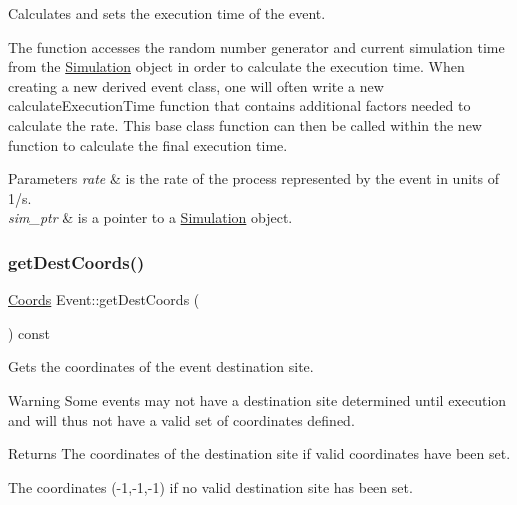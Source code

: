 Calculates and sets the execution time of the event. 

The function accesses the random number generator and current simulation time from the \hyperlink{class_simulation}{Simulation} object in order to calculate the execution time. When creating a new derived event class, one will often write a new calculate\+Execution\+Time function that contains additional factors needed to calculate the rate. This base class function can then be called within the new function to calculate the final execution time. 
\begin{DoxyParams}{Parameters}
{\em rate} & is the rate of the process represented by the event in units of 1/s. \\
\hline
{\em sim\+\_\+ptr} & is a pointer to a \hyperlink{class_simulation}{Simulation} object. \\
\hline
\end{DoxyParams}
\mbox{\label{class_event_a6b4287971afaca8211f91f361ef55997}} 
\subsubsection{\texorpdfstring{get\+Dest\+Coords()}{getDestCoords()}}
{\footnotesize\ttfamily \hyperlink{struct_coords}{Coords} Event\+::get\+Dest\+Coords (\begin{DoxyParamCaption}{ }\end{DoxyParamCaption}) const}



Gets the coordinates of the event destination site. 

\begin{DoxyWarning}{Warning}
Some events may not have a destination site determined until execution and will thus not have a valid set of coordinates defined. 
\end{DoxyWarning}
\begin{DoxyReturn}{Returns}
The coordinates of the destination site if valid coordinates have been set. 

The coordinates (-\/1,-\/1,-\/1) if no valid destination site has been set. 
\end{DoxyReturn}
\mbox{\label{class_event_a65550d982cdf85d993658cd7070c960c}} 
